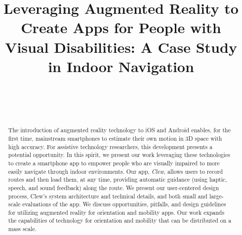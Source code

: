 \documentclass[chi]{sigchi}
\def\plaintitle{Leveraging Augmented Reality to Create Apps for People with Visual Disabilities: A Case Study in Indoor Navigation}
\begin{document}
\title{\plaintitle}

\author{%
  \\
              \\
    \\
}

\maketitle

\begin{abstract}
The introduction of augmented reality technology to iOS and Android enables, for the first time, mainstream smartphones to estimate their own motion in 3D space with high accuracy.  For assistive technology researchers, this development presents a potential opportunity.  In this spirit, we present our work leveraging these technologies to create a smartphone app to empower people who are visually impaired to more easily navigate through indoor environments.  Our app, \emph{Clew}, allows users to record routes and then load them, at any time, providing automatic guidance (using haptic, speech, and sound feedback) along the route.  We present our user-centered design process, Clew's system architecture and technical details, and both small and large-scale evaluations of the app.  We discuss opportunities, pitfalls, and design guidelines for utilizing augmented reality for orientation and mobility apps.  Our work expands the capabilities of technology for orientation and mobility that can be distributed on a mass scale.
\end{abstract}

\end{document}
